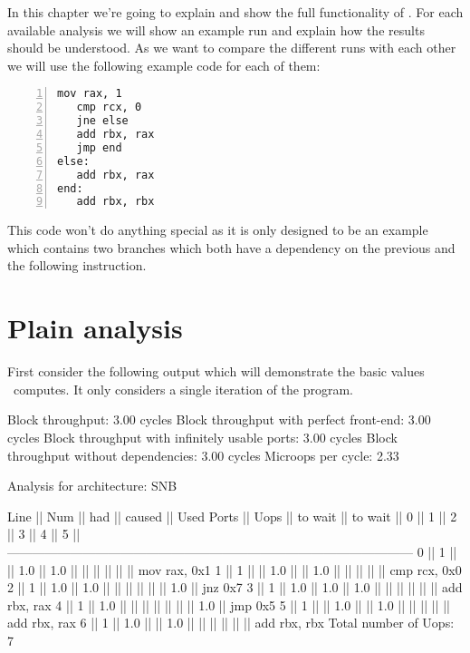 In this chapter we're going to explain and show the full functionality of \suaca. For each available analysis we will show an example run and explain how the results should be understood. As we want to compare the different runs with each other we will use the following example code for each of them:

\begin{mdframed}[backgroundcolor=light-gray, roundcorner=10pt,leftmargin=1, rightmargin=1, innerleftmargin=15, innertopmargin=1,innerbottommargin=1, outerlinewidth=1, linecolor=light-gray]
\begin{lstlisting}[language={myLang}, basicstyle=\small, numbers=left]
   mov rax, 1
   cmp rcx, 0
   jne else
   add rbx, rax
   jmp end
else:
   add rbx, rax
end:
   add rbx, rbx
\end{lstlisting}
\end{mdframed}

This code won't do anything special as it is only designed to be an example which contains two branches which both have a dependency on the previous and the following instruction.

\section{Plain analysis}
\label{sec:plain}

First consider the following output which will demonstrate the basic values \suaca\ computes. It only considers a single iteration of the program.


\begin{example}
Block throughput: 3.00 cycles
Block throughput with perfect front-end: 3.00 cycles
Block throughput with infinitely usable ports: 3.00 cycles
Block throughput without dependencies: 3.00 cycles
Microops per cycle: 2.33

Analysis for architecture: SNB

 Line  ||   Num   ||   had   || caused  ||            Used Ports
       ||   Uops  || to wait || to wait ||   0   ||   1   ||   2   ||   3   ||   4   ||   5   ||
 ------------------------------------------------------------------------------------------------
   0   ||    1    ||         ||   1.0   ||  1.0  ||       ||       ||       ||       ||       || mov rax, 0x1
   1   ||    1    ||         ||   1.0   ||       ||  1.0  ||       ||       ||       ||       || cmp rcx, 0x0
   2   ||    1    ||   1.0   ||   1.0   ||       ||       ||       ||       ||       ||  1.0  || jnz 0x7
   3   ||    1    ||   1.0   ||   1.0   ||  1.0  ||       ||       ||       ||       ||       || add rbx, rax
   4   ||    1    ||   1.0   ||         ||       ||       ||       ||       ||       ||  1.0  || jmp 0x5
   5   ||    1    ||         ||   1.0   ||       ||  1.0  ||       ||       ||       ||       || add rbx, rax
   6   ||    1    ||   1.0   ||         ||  1.0  ||       ||       ||       ||       ||       || add rbx, rbx
Total number of Uops: 7
\end{example}


